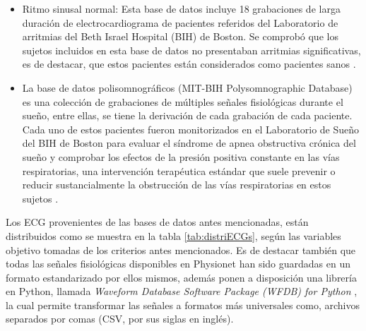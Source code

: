 \documentclass[12pt,letterpaper,oneside,openright]{book}
\begin{document}
\begin{itemize}
	\item Ritmo sinusal normal: Esta base de datos incluye 18 grabaciones de larga duración de electrocardiograma de pacientes referidos del Laboratorio de arritmias del Beth Israel Hospital (BIH) de Boston. Se comprobó que los sujetos incluidos en esta base de datos no presentaban arritmias significativas, es de destacar, que estos pacientes están considerados como pacientes sanos \cite{normalsinusrhythmdb}. 
	\item La base de datos polisomnográficos (MIT-BIH Polysomnographic Database) es una colección de grabaciones de múltiples señales fisiológicas durante el sueño, entre ellas, se tiene la derivación  de cada grabación de cada paciente. Cada uno de estos pacientes fueron monitorizados en el Laboratorio de Sueño del BIH de Boston para evaluar el síndrome de apnea obstructiva crónica del sueño y comprobar los efectos de la presión positiva constante en las vías respiratorias, una intervención terapéutica estándar que suele prevenir o reducir sustancialmente la obstrucción de las vías respiratorias en estos sujetos \cite{polysomnogradb}.
	
\end{itemize}
Los ECG provenientes de las bases de datos antes mencionadas, están distribuidos como se muestra en la tabla \ref{tab:distriECGs}, según las variables objetivo tomadas de los criterios antes mencionados. 
Es de destacar también que todas las señales fisiológicas disponibles en Physionet han sido guardadas en un formato estandarizado por ellos mismos, además ponen a disposición una librería en Python, llamada \emph{Waveform Database Software Package (WFDB) for Python} \cite{wfdb}, la cual permite transformar las señales a formatos más universales como, archivos separados por comas (CSV, por sus siglas en inglés). 
\end{document}
